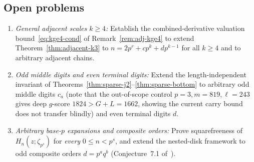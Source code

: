\documentclass[11pt,reqno]{amsart}
\numberwithin{equation}{section}
\theoremstyle{definition}
\theoremstyle{remark}
\begin{document}
\subsection*{Open problems}
\begin{enumerate}[label=(\arabic*),leftmargin=2em]
\item \emph{General adjacent scales $k\ge 4$:} Establish the combined-derivative valuation bound~\eqref{eq:kge4-cond} of Remark~\ref{rem:adj-kge4} to extend Theorem~\ref{thm:adjacent-k3} to $n=2p^r+cp^k+dp^{k-1}$ for all $k\ge 4$ and to arbitrary adjacent chains.
\item \emph{Odd middle digits and even terminal digits:} Extend the length-independent invariant of Theorems~\ref{thm:sparse-j2}--\ref{thm:sparse-bottom} to arbitrary odd middle digits $c_a$ (note that the out-of-scope control $p=3, m=819, \ell=243$ gives deep $g$-score $1824 > G+L=1662$, showing the current carry bound does not transfer blindly) and even terminal digits $d$.
\item \emph{Arbitrary base-$p$ expansions and composite orders:} Prove squarefreeness of $H_n(z;\zeta_{p^s})$ for \emph{every} $0\le n<p^s$, and extend the nested-disk framework to odd composite orders $d=p^a q^b$ (Conjecture~7.1 of~\cite{KKKKK26rs}).
\end{enumerate}
\end{document}
